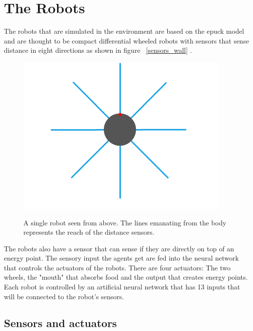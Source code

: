 \documentclass[a4paper]{book}
\begin{document}

\section{The Robots}
The robots that are simulated in the environment are based on the epuck model and are  thought to be compact differential wheeled robots with sensors that sense distance in eight directions as shown in figure ~\ref{sensors_wall} . 

\begin{figure}[H]
\includegraphics[width=\textwidth]{misc/sensors_wall.png}
\label{fig:sensors_wall}
\caption{A single robot seen from above. The lines emanating from the body represents the reach of the distance sensors.} 
\end{figure}

The robots also have a sensor that can sense if they are directly on top of an energy point. 
The sensory input the agents get are fed into the neural network that controls the actuators of the robots. 
There are four actuators: The two wheels, the "mouth" that absorbs food and the output that creates energy points. 
Each robot is controlled by an artificial neural network that has 13 inputs that will be connected to the robot's sensors. 

\subsection{Sensors and actuators}
\end{document}
